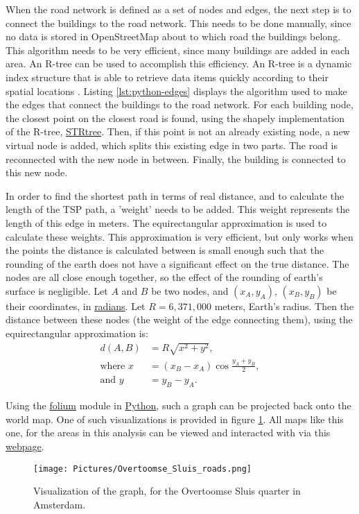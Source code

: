 When the road network is defined as a set of nodes and edges, the next step is to connect the buildings
to the road network. This needs to be done manually, since no data is stored in OpenStreetMap
about to which road the buildings belong. This algorithm needs to be very efficient, since many
buildings are added in each area. An R-tree can be used to accomplish this efficiency.
An R-tree is a dynamic index structure that is able to retrieve data items quickly according to
their spatial locations \citep{guttman1984r}. Listing \ref{lst:python-edges} displays the algorithm
used to make the edges that connect the buildings to the road network. For each building node,
the closest point on the closest road is found, using the shapely implementation of the R-tree,
\url{STRtree}. Then, if this point is not an already existing node, a new virtual node is added,
which splits this existing edge in two parts. The road is reconnected with the new node in between.
Finally, the building is connected to this new node.

In order to find the shortest path in terms of real distance, and to calculate the length of the
TSP path, a 'weight' needs to be added. This weight represents the length of this edge in meters.
The equirectangular approximation is used to calculate these weights. This approximation is very
efficient, but only works when the points the distance is calculated between is small enough such
that the rounding of the earth does not have a significant effect on the true distance.
The nodes are all close enough together, so the effect of the
rounding of earth's surface is negligible. Let $A$ and $B$ be two nodes,
and $(x_A,y_A)$, $(x_B,y_B)$ be their coordinates, in \url{radians}. Let $R=6,371,000$ meters,
Earth's radius. Then the distance between these nodes (the weight of the edge connecting them),
using the equirectangular approximation is:
\begin{align}
	\label{eq:equirectangluar_approx}
	d(A,B)         & =R\sqrt{x^2+y^2},                  \\
	\text{where }x & =(x_B-x_A)\cos{\frac{y_A+y_B}{2}}, \\
	\text{and }y   & =y_B-y_A.
\end{align}

Using the \url{folium} module in \url{Python}, such a graph can be projected back onto the world map.
One of such visualizations is provided in figure \ref{fig:overtoomse_sluis}. All maps like this one,
for the areas in this analysis can be viewed and interacted with via this
\href{https://koenstevens.nl/wp-content/uploads/maps/}{\url{webpage}}.
\begin{figure}[H]
	\caption{Visualization of the graph, for the Overtoomse Sluis quarter in Amsterdam.}
	\label{fig:overtoomse_sluis}
	\texttt{[image: Pictures/Overtoomse\_Sluis\_roads.png]}
\end{figure}

